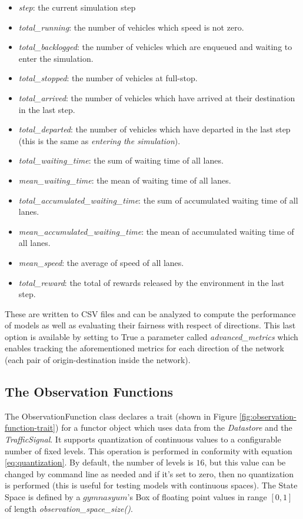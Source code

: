\begin{itemize}
  \begin{itemize}
    \item \textit{step}: the current simulation step
    \item \textit{total\_running}: the number of vehicles which speed is not zero.
    \item \textit{total\_backlogged}: the number of vehicles which are enqueued and waiting to enter the simulation.
    \item \textit{total\_stopped}: the number of vehicles at full-stop.
    \item \textit{total\_arrived}: the number of vehicles which have arrived at their destination in the last step.
    \item \textit{total\_departed}: the number of vehicles which have departed in the last step (this is the same as \textit{entering the simulation}).
    \item \textit{total\_waiting\_time}: the sum of waiting time of all lanes.
    \item \textit{mean\_waiting\_time}: the mean of waiting time of all lanes.
    \item \textit{total\_accumulated\_waiting\_time}: the sum of accumulated waiting time of all lanes.
    \item \textit{mean\_accumulated\_waiting\_time}: the mean of accumulated waiting time of all lanes.
    \item \textit{mean\_speed}: the average of speed of all lanes.
    \item \textit{total\_reward}: the total of rewards released by the environment in the last step.
  \end{itemize}
  These are written to CSV files and can be analyzed to compute the performance of models as well as evaluating their fairness with respect of directions. This last option is available by setting to True a parameter called \textit{advanced\_metrics} which enables tracking the aforementioned metrics for each direction of the network (each pair of origin-destination inside the network).
\end{itemize}

\subsection{The Observation Functions}

The ObservationFunction class declares a trait (shown in Figure \ref{fig:observation-function-trait}) for a functor object which uses data from the \textit{Datastore} and the \textit{TrafficSignal}.
It supports quantization of continuous values to a configurable number of fixed levels. This operation is performed in conformity with equation \ref{eq:quantization}. By default, the number of levels is $16$, but this value can be changed by command line as needed and if it's set to zero, then no quantization is performed (this is useful for testing models with continuous spaces).
The State Space is defined by a $gymnasyum$'s Box of floating point values in range $[0, 1]$ of length \textit{observation\_space\_size()}.

